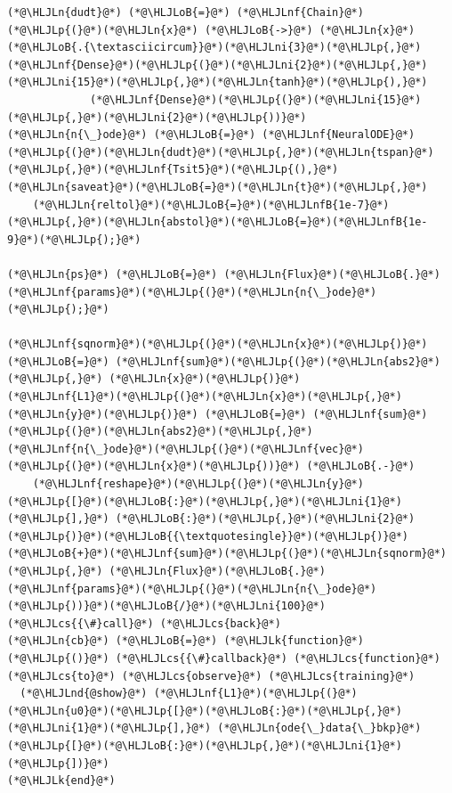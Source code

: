 \documentclass[12pt,a4paper]{article}
\newcommand{\HLJLk}[1]{\textcolor[RGB]{148,91,176}{\textbf{#1}}}
\newcommand{\HLJLn}[1]{#1}
\newcommand{\HLJLnd}[1]{\textcolor[RGB]{214,102,97}{#1}}
\newcommand{\HLJLnf}[1]{\textcolor[RGB]{66,102,213}{#1}}
\newcommand{\HLJLnfB}[1]{\textcolor[RGB]{59,151,46}{#1}}
\newcommand{\HLJLni}[1]{\textcolor[RGB]{59,151,46}{#1}}
\newcommand{\HLJLoB}[1]{\textcolor[RGB]{102,102,102}{\textbf{#1}}}
\newcommand{\HLJLp}[1]{#1}
\newcommand{\HLJLcs}[1]{\textcolor[RGB]{153,153,119}{\textit{#1}}}
\begin{document}
\begin{lstlisting}
(*@\HLJLn{dudt}@*) (*@\HLJLoB{=}@*) (*@\HLJLnf{Chain}@*)(*@\HLJLp{(}@*)(*@\HLJLn{x}@*) (*@\HLJLoB{->}@*) (*@\HLJLn{x}@*)(*@\HLJLoB{.{\textasciicircum}}@*)(*@\HLJLni{3}@*)(*@\HLJLp{,}@*) (*@\HLJLnf{Dense}@*)(*@\HLJLp{(}@*)(*@\HLJLni{2}@*)(*@\HLJLp{,}@*)(*@\HLJLni{15}@*)(*@\HLJLp{,}@*)(*@\HLJLn{tanh}@*)(*@\HLJLp{),}@*)
             (*@\HLJLnf{Dense}@*)(*@\HLJLp{(}@*)(*@\HLJLni{15}@*)(*@\HLJLp{,}@*)(*@\HLJLni{2}@*)(*@\HLJLp{))}@*)
(*@\HLJLn{n{\_}ode}@*) (*@\HLJLoB{=}@*) (*@\HLJLnf{NeuralODE}@*)(*@\HLJLp{(}@*)(*@\HLJLn{dudt}@*)(*@\HLJLp{,}@*)(*@\HLJLn{tspan}@*)(*@\HLJLp{,}@*)(*@\HLJLnf{Tsit5}@*)(*@\HLJLp{(),}@*)(*@\HLJLn{saveat}@*)(*@\HLJLoB{=}@*)(*@\HLJLn{t}@*)(*@\HLJLp{,}@*)
	(*@\HLJLn{reltol}@*)(*@\HLJLoB{=}@*)(*@\HLJLnfB{1e-7}@*)(*@\HLJLp{,}@*)(*@\HLJLn{abstol}@*)(*@\HLJLoB{=}@*)(*@\HLJLnfB{1e-9}@*)(*@\HLJLp{);}@*)

(*@\HLJLn{ps}@*) (*@\HLJLoB{=}@*) (*@\HLJLn{Flux}@*)(*@\HLJLoB{.}@*)(*@\HLJLnf{params}@*)(*@\HLJLp{(}@*)(*@\HLJLn{n{\_}ode}@*)(*@\HLJLp{);}@*)

(*@\HLJLnf{sqnorm}@*)(*@\HLJLp{(}@*)(*@\HLJLn{x}@*)(*@\HLJLp{)}@*) (*@\HLJLoB{=}@*) (*@\HLJLnf{sum}@*)(*@\HLJLp{(}@*)(*@\HLJLn{abs2}@*)(*@\HLJLp{,}@*) (*@\HLJLn{x}@*)(*@\HLJLp{)}@*)
(*@\HLJLnf{L1}@*)(*@\HLJLp{(}@*)(*@\HLJLn{x}@*)(*@\HLJLp{,}@*) (*@\HLJLn{y}@*)(*@\HLJLp{)}@*) (*@\HLJLoB{=}@*) (*@\HLJLnf{sum}@*)(*@\HLJLp{(}@*)(*@\HLJLn{abs2}@*)(*@\HLJLp{,}@*) (*@\HLJLnf{n{\_}ode}@*)(*@\HLJLp{(}@*)(*@\HLJLnf{vec}@*)(*@\HLJLp{(}@*)(*@\HLJLn{x}@*)(*@\HLJLp{))}@*) (*@\HLJLoB{.-}@*) 
	(*@\HLJLnf{reshape}@*)(*@\HLJLp{(}@*)(*@\HLJLn{y}@*)(*@\HLJLp{[}@*)(*@\HLJLoB{:}@*)(*@\HLJLp{,}@*)(*@\HLJLni{1}@*)(*@\HLJLp{],}@*) (*@\HLJLoB{:}@*)(*@\HLJLp{,}@*)(*@\HLJLni{2}@*)(*@\HLJLp{)}@*)(*@\HLJLoB{{\textquotesingle}}@*)(*@\HLJLp{)}@*)(*@\HLJLoB{+}@*)(*@\HLJLnf{sum}@*)(*@\HLJLp{(}@*)(*@\HLJLn{sqnorm}@*)(*@\HLJLp{,}@*) (*@\HLJLn{Flux}@*)(*@\HLJLoB{.}@*)(*@\HLJLnf{params}@*)(*@\HLJLp{(}@*)(*@\HLJLn{n{\_}ode}@*)(*@\HLJLp{))}@*)(*@\HLJLoB{/}@*)(*@\HLJLni{100}@*)
(*@\HLJLcs{{\#}call}@*) (*@\HLJLcs{back}@*)
(*@\HLJLn{cb}@*) (*@\HLJLoB{=}@*) (*@\HLJLk{function}@*) (*@\HLJLp{()}@*) (*@\HLJLcs{{\#}callback}@*) (*@\HLJLcs{function}@*) (*@\HLJLcs{to}@*) (*@\HLJLcs{observe}@*) (*@\HLJLcs{training}@*)
  (*@\HLJLnd{@show}@*) (*@\HLJLnf{L1}@*)(*@\HLJLp{(}@*)(*@\HLJLn{u0}@*)(*@\HLJLp{[}@*)(*@\HLJLoB{:}@*)(*@\HLJLp{,}@*)(*@\HLJLni{1}@*)(*@\HLJLp{],}@*) (*@\HLJLn{ode{\_}data{\_}bkp}@*)(*@\HLJLp{[}@*)(*@\HLJLoB{:}@*)(*@\HLJLp{,}@*)(*@\HLJLni{1}@*)(*@\HLJLp{])}@*)
(*@\HLJLk{end}@*)


\end{lstlisting}
\end{document}
